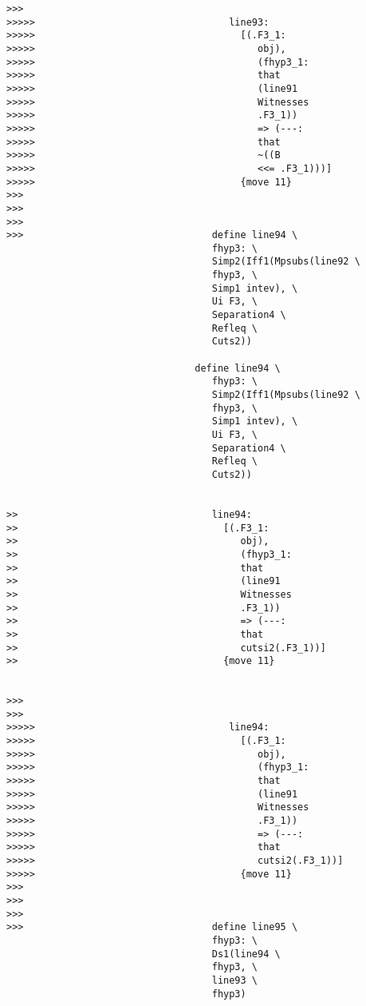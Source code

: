 \documentclass[12pt]{article}
\begin{document}
\begin{verbatim}
>>>
>>>>>                                  line93:
>>>>>                                    [(.F3_1:
>>>>>                                       obj),
>>>>>                                       (fhyp3_1:
>>>>>                                       that
>>>>>                                       (line91
>>>>>                                       Witnesses
>>>>>                                       .F3_1))
>>>>>                                       => (---:
>>>>>                                       that
>>>>>                                       ~((B
>>>>>                                       <<= .F3_1)))]
>>>>>                                    {move 11}
>>>
>>>
>>>
>>>                                 define line94 \
                                    fhyp3: \
                                    Simp2(Iff1(Mpsubs(line92 \
                                    fhyp3, \
                                    Simp1 intev), \
                                    Ui F3, \
                                    Separation4 \
                                    Refleq \
                                    Cuts2))

                                 define line94 \
                                    fhyp3: \
                                    Simp2(Iff1(Mpsubs(line92 \
                                    fhyp3, \
                                    Simp1 intev), \
                                    Ui F3, \
                                    Separation4 \
                                    Refleq \
                                    Cuts2))


>>                                  line94:
>>                                    [(.F3_1:
>>                                       obj),
>>                                       (fhyp3_1:
>>                                       that
>>                                       (line91
>>                                       Witnesses
>>                                       .F3_1))
>>                                       => (---:
>>                                       that
>>                                       cutsi2(.F3_1))]
>>                                    {move 11}


>>>
>>>
>>>>>                                  line94:
>>>>>                                    [(.F3_1:
>>>>>                                       obj),
>>>>>                                       (fhyp3_1:
>>>>>                                       that
>>>>>                                       (line91
>>>>>                                       Witnesses
>>>>>                                       .F3_1))
>>>>>                                       => (---:
>>>>>                                       that
>>>>>                                       cutsi2(.F3_1))]
>>>>>                                    {move 11}
>>>
>>>
>>>
>>>                                 define line95 \
                                    fhyp3: \
                                    Ds1(line94 \
                                    fhyp3, \
                                    line93 \
                                    fhyp3)


\end{verbatim}
\end{document}

